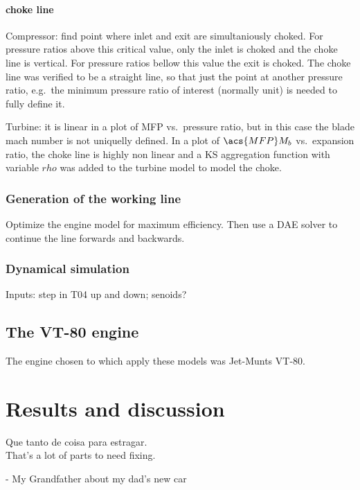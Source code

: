 \documentclass[tcc]{subfiles}
\begin{document}
\subsubsection{choke line}
Compressor: find point where inlet and exit are simultaniously choked. For pressure ratios above this critical value, only the inlet is choked and the choke line is vertical. For pressure ratios bellow this value the exit is choked. The choke line was verified to be a straight line, so that just the point at another pressure ratio, e.g.\ the minimum pressure ratio of interest (normally unit) is needed to fully define it.

Turbine: it is linear in a plot of \acs{MFP} vs.\ pressure ratio, but in this case the blade mach number is not uniquelly defined. In a plot of $\acs{MFP}M_b$ vs.\ expansion ratio, the choke line is highly non linear and a KS aggregation function with variable $rho$ was added to the turbine model to model the choke.  

\subsection{Generation of the working line}
Optimize the engine model for maximum efficiency. 
Then use a \ac{DAE} solver to continue the line forwards and backwards.

\subsection{Dynamical simulation}
Inputs: step in T04 up and down; senoids?

\section{The VT-80 engine}
The engine chosen to which apply these models was Jet-Munts VT-80.

\chapter{Results and discussion}
\epigraph{Que tanto de coisa para estragar.\\{\footnotesize That's a lot of parts to need fixing.}}{- My Grandfather about my dad's new car}
\end{document}
